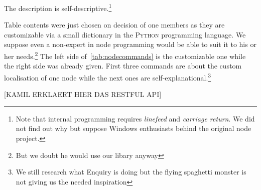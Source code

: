 The description is self-descriptive.\footnote{Note that internal programming requires \textit{linefeed} and \textit{carriage return}. We did not find out 
why but suppose Windows enthusiasts behind the original node project.}

Table contents were just chosen on decision of one members as they are customizable via a small dictionary in the \textsc{Python} programming language. We 
suppose even a non-expert in node programming would be able to suit it to his or her needs.\footnote{But we doubt he would use our libary anyway}
The left side of~\ref{tab:nodecommands} is the customizable one while the right side was already given. First three commands are about the 
custom localisation of one node while the next ones are self-explanational.\footnote{We still research what Enquiry is doing but the flying spaghetti monster is not giving us the needed inspiration}

[KAMIL ERKLAERT HIER DAS RESTFUL API]
